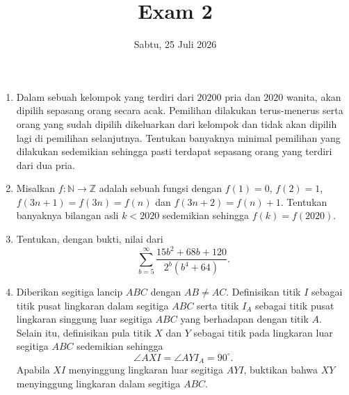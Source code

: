 \documentclass[a4paper, 12pt]{article}
\title{Exam 2}
\date{Sabtu, 25 Juli 2026}
\begin{document}
\maketitle

\renewcommand*\contentsname{Daftar Isi}
\tableofcontents

\newpage

\begin{enumerate}
    \item Dalam sebuah kelompok yang terdiri dari $20200$ pria dan $2020$ wanita, akan dipilih sepasang orang secara acak. Pemilihan dilakukan terus-menerus serta orang yang sudah dipilih dikeluarkan dari kelompok dan tidak akan dipilih lagi di pemilihan selanjutnya. Tentukan banyaknya minimal pemilihan yang dilakukan sedemikian sehingga pasti terdapat sepasang orang yang terdiri dari dua pria.
    \item Misalkan $f:\mathbb{N}\rightarrow\mathbb{Z}$ adalah sebuah fungsi dengan $f(1)=0$, $f(2)=1$, $f(3n+1)=f(3n)=f(n)$ dan $f(3n+2)=f(n)+1$. Tentukan banyaknya bilangan asli $k<2020$ sedemikian sehingga $f(k)=f(2020)$.
    \item Tentukan, dengan bukti, nilai dari
    \[ \sum_{b=5}^{\infty}\frac{15b^2+68b+120}{2^b(b^4+64)}. \]

    \item Diberikan segitiga lancip $ABC$ dengan $AB \neq AC$. Definisikan titik $I$ sebagai titik pusat lingkaran dalam segitiga $ABC$ serta titik $I_A$ sebagai titik pusat lingkaran singgung luar segitiga $ABC$ yang berhadapan dengan titik $A$. Selain itu, definisikan pula titik $X$ dan $Y$ sebagai titik pada lingkaran luar segitiga $ABC$ sedemikian sehingga 
    \[ \angle AXI = \angle AYI_A = 90^\circ. \]
    Apabila $XI$ menyinggung lingkaran luar segitiga $AYI$, buktikan bahwa $XY$ menyinggung lingkaran dalam segitiga $ABC$.
\end{enumerate}
\end{document}
